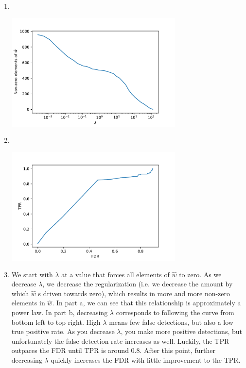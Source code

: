 \documentclass{article}
\begin{document}
\begin{enumerate}
        \item \, \newline \vspace{-1.5cm}
        \begin{center}
                \includegraphics[width=0.7\textwidth]{code/A4a.pdf}
        \end{center}

        \item \, \newline \vspace{-1.5cm}
        \begin{center}
                \includegraphics[width=0.7\textwidth]{code/A4b.pdf}
        \end{center}

        \item We start with $\lambda$ at a value that forces all elements of $\hat{w}$ to zero.
        As we decrease $\lambda$, we decrease the regularization (i.e. we decrease the amount by which $\hat{w}$ s driven towards zero), which results in more and more non-zero elements in $\hat{w}$.
        In part a, we can see that this relationship is approximately a power law.
        In part b, decreasing $\lambda$ corresponds to following the curve from bottom left to top right.
        High $\lambda$ means few false detections, but also a low true positive rate.
        As you decrease $\lambda$, you make more positive detections, but unfortunately the false detection rate increases as well.
        Luckily, the TPR outpaces the FDR until TPR is around 0.8.
        After this point, further decreasing $\lambda$ quickly increases the FDR with little improvement to the TPR.


\end{enumerate}
\end{document}
